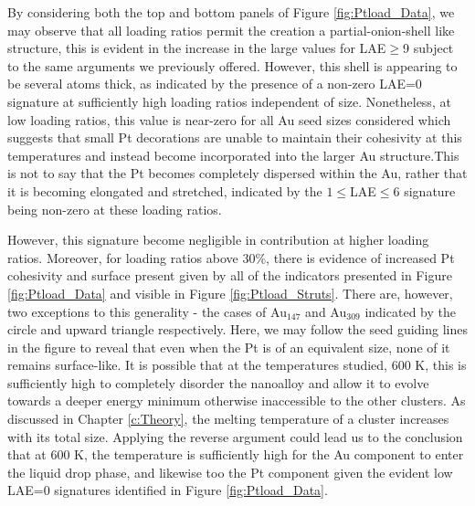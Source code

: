 By considering both the top and bottom panels of Figure \ref{fig:Ptload_Data}, we may observe that all loading ratios permit the creation a partial-onion-shell like structure, this is evident in the increase in the large values for LAE$\geq$9 subject to the same arguments we previously offered. However, this shell is appearing to be several atoms thick, as indicated by the presence of a non-zero LAE=0 signature at sufficiently high loading ratios independent of size. Nonetheless, at low loading ratios, this value is near-zero for all Au seed sizes considered which suggests that small Pt decorations are unable to maintain their cohesivity at this temperatures and instead become incorporated into the larger Au structure.This is not to say that the Pt becomes completely dispersed within the Au, rather that it is becoming elongated and stretched, indicated by the $1\leq$LAE$\leq$6 signature being non-zero at these loading ratios. 

However, this signature become negligible in contribution at higher loading ratios. Moreover, for loading ratios above 30\%, there is evidence of increased Pt cohesivity and surface present given by all of the indicators presented in Figure \ref{fig:Ptload_Data} and visible in Figure \ref{fig:Ptload_Struts}. There are, however, two exceptions to this generality - the cases of Au$_{147}$ and Au$_{309}$ indicated by the circle and upward triangle respectively. Here, we may follow the seed guiding lines in the figure to reveal that even when the Pt is of an equivalent size, none of it remains surface-like. It is possible that at the temperatures studied, 600 K, this is sufficiently high to completely disorder the nanoalloy and allow it to evolve towards a deeper energy minimum otherwise inaccessible to the other clusters. As discussed in Chapter \ref{c:Theory}, the melting temperature of a cluster increases with its total size. Applying the reverse argument could lead us to the conclusion that at 600 K, the temperature is sufficiently high for the Au component to enter the liquid drop phase, and likewise too the Pt component given the evident low LAE=0 signatures identified in Figure \ref{fig:Ptload_Data}. 

